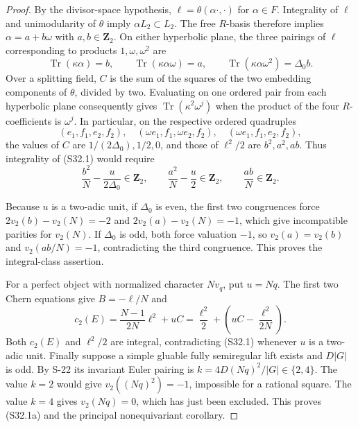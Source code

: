 \begin{proof}
By the divisor-space hypothesis, $\ell=\theta(\alpha\cdot,\cdot)$
for $\alpha\in F$. Integrality of $\ell$ and unimodularity
of $\theta$ imply $\alpha L_2\subset L_2$.
The free $R$-basis therefore implies
$\alpha=a+b\omega$ with $a,b\in\mathbf Z_2$.
On either hyperbolic plane, the three pairings of $\ell$
corresponding to products $1,\omega,\omega^2$ are
\[
 \operatorname{Tr}(\kappa\alpha)=b,\qquad
 \operatorname{Tr}(\kappa\alpha\omega)=a,\qquad
 \operatorname{Tr}(\kappa\alpha\omega^2)=\Delta_0b.
 \tag{S32.3}
\]
Over a splitting field, $C$ is the sum of the squares
of the two embedding components of $\theta$, divided
by two. Evaluating on one ordered pair from each
hyperbolic plane consequently gives
$\operatorname{Tr}(\kappa^2\omega^j)$ when the product
of the four $R$-coefficients is $\omega^j$.
In particular, on the respective ordered quadruples
\[
 (e_1,f_1,e_2,f_2),\quad
 (\omega e_1,f_1,\omega e_2,f_2),\quad
 (\omega e_1,f_1,e_2,f_2),
\]
the values of $C$ are $1/(2\Delta_0),1/2,0$,
and those of $\ell^2/2$ are $b^2,a^2,ab$.
Thus integrality of (S32.1) would require
\[
 \frac{b^2}{N}-\frac{u}{2\Delta_0}\in\mathbf Z_2,
 \qquad
 \frac{a^2}{N}-\frac{u}{2}\in\mathbf Z_2,
 \qquad
 \frac{ab}{N}\in\mathbf Z_2.
 \tag{S32.4}
\]

Because $u$ is a two-adic unit, if $\Delta_0$ is even,
the first two congruences force
$2v_2(b)-v_2(N)=-2$ and
$2v_2(a)-v_2(N)=-1$, which give incompatible parities
for $v_2(N)$. If $\Delta_0$ is odd, both force valuation
$-1$, so $v_2(a)=v_2(b)$ and
$v_2(ab/N)=-1$, contradicting the third congruence.
This proves the integral-class assertion.

For a perfect object with normalized character
$Nv_q$, put $u=Nq$. The first two Chern equations give
$B=-\ell/N$ and
\[
 c_2(E)=\frac{N-1}{2N}\ell^2+uC
       =\frac{\ell^2}{2}
          +\left(uC-\frac{\ell^2}{2N}\right).
\]
Both $c_2(E)$ and $\ell^2/2$ are integral, contradicting
(S32.1) whenever $u$ is a two-adic unit.
Finally suppose a simple gluable fully semiregular lift
exists and $D|G|$ is odd. By S-22 its invariant Euler
pairing is
$k=4D(Nq)^2/|G|\in\{2,4\}$.
The value $k=2$ would give
$v_2((Nq)^2)=-1$, impossible for a rational square.
The value $k=4$ gives $v_2(Nq)=0$, which has just been
excluded. This proves (S32.1a) and the principal
nonequivariant corollary.
\end{proof}
